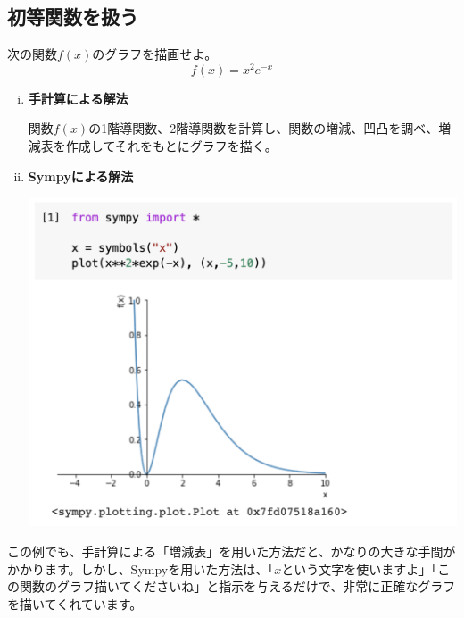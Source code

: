 \documentclass[12pt, a5paper]{jsbook}
\begin{document}
\subsection{初等関数を扱う}
\begin{framed}
\begin{exq}
次の関数$f(x)$のグラフを描画せよ。
$$f(x) = x^2e^{-x}$$
\end{exq}
\end{framed}
\begin{enumerate}[(i)]
    \item 
    {\bf 手計算による解法}
    
関数$f(x)$の1階導関数、2階導関数を計算し、関数の増減、凹凸を調べ、増減表を作成してそれをもとにグラフを描く。\\
    \item
    {\bf Sympyによる解法}
    \begin{center}
    \includegraphics[scale=0.3]{fig1-2-2.png}
    \end{center}    
\end{enumerate}
この例でも、手計算による「増減表」を用いた方法だと、かなりの大きな手間がかかります。しかし、Sympyを用いた方法は、「$x$という文字を使いますよ」「この関数のグラフ描いてくださいね」と指示を与えるだけで、非常に正確なグラフを描いてくれています。
\end{document}

